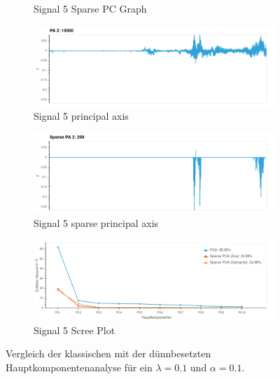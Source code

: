 \begin{figure}
\begin{subfigure}{0.45\textwidth}
\caption{Signal 5 Sparse PC Graph}
\label{sparse_pca_classical_analysis_sparse_pc_graph}
\end{subfigure}
%
\begin{subfigure}{0.9\textwidth}
\centering
\includegraphics[width=\textwidth]{figures/Signal_5_principal_axis.png}
\caption{Signal 5 principal axis}
\label{sparse_pca_classical_analysis_principal_axis}
\end{subfigure}
%
\begin{subfigure}{0.9\textwidth}
\centering
\includegraphics[width=\textwidth]{figures/Signal_5_sparse_principal_axis.png}
\caption{Signal 5 sparse principal axis}
\label{sparse_pca_classical_analysis_sparse_principal_axis}
\end{subfigure}
%
\begin{subfigure}{0.9\textwidth}
\centering
\includegraphics[width = \textwidth]{figures/Signal_5_scree_plot_10.png}
\caption{Signal 5 Scree Plot}
\label{sparse_pca_classical_analysis_scree_plot}
\end{subfigure}
\caption{Vergleich der klassischen mit der dünnbesetzten Hauptkomponentenanalyse für ein $\lambda=0.1$ und $\alpha = 0.1$.}
\label{sparse_pca_classical_analysis}
\end{figure}


